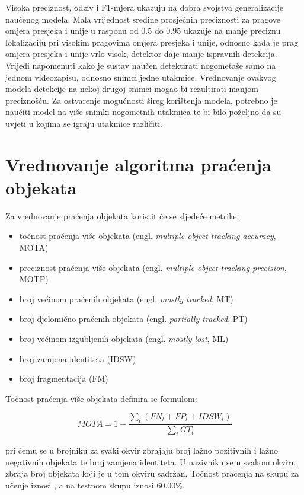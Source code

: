 \documentclass[times, utf8, seminar, numeric]{fer}
\begin{document}
Visoka preciznost, odziv i F1-mjera ukazuju na dobra svojstva generalizacije naučenog modela. 
Mala vrijednost sredine prosječnih preciznosti za pragove omjera presjeka i unije u rasponu od 0.5 do 0.95 ukazuje na manje preciznu lokalizaciju pri visokim pragovima omjera presjeka i unije, odnosno kada je prag omjera presjeka i unije vrlo visok, detektor daje manje ispravnih detekcija.
Vrijedi napomenuti kako je sustav naučen detektirati nogometaše samo na jednom videozapisu, odnosno snimci jedne utakmice. Vrednovanje ovakvog modela detekcije na nekoj drugoj snimci mogao bi rezultirati manjom preciznošću. Za ostvarenje mogućnosti šireg korištenja modela, potrebno je naučiti model na više snimki nogometnih utakmica te bi bilo poželjno da su uvjeti u kojima se igraju utakmice različiti.

\section{Vrednovanje algoritma praćenja objekata}

Za vrednovanje praćenja objekata koristit će se sljedeće metrike:

\begin{itemize}
	\item točnost praćenja više objekata (engl. \textit{multiple object tracking accuracy}, MOTA)
	\item preciznost praćenja više objekata (engl. \textit{multiple object tracking precision}, MOTP)
	\item broj većinom praćenih objekata (engl. \textit{mostly tracked}, MT)
	\item broj djelomično praćenih objekata (engl. \textit{partially tracked}, PT)
	\item broj većinom izgubljenih objekata (engl. \textit{mostly lost}, ML)
	\item broj zamjena identiteta (IDSW)
	\item broj fragmentacija (FM)	
\end{itemize}

Točnost praćenja više objekata definira se formulom:

\[MOTA = 1- \frac{\sum_{t}(FN_t + FP_t + IDSW_t)}{\sum_{t} GT_t}\]

pri čemu se u brojniku za svaki okvir zbrajaju broj lažno pozitivnih i lažno negativnih objekata te broj zamjena identiteta. U nazivniku se u svakom okviru zbraja broj objekata koji je u tom okviru sadržan. Točnost praćenja na skupu za učenje iznosi , a na testnom skupu iznosi 60.00\%.
\end{document}
